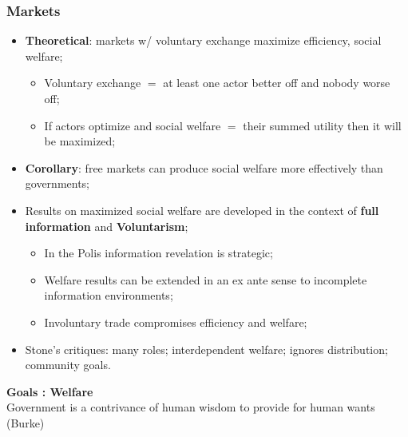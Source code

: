 \documentclass[aspectratio=169]{beamer}
\theoremstyle{principle}
\begin{document}
\begin{frame}
\frametitle{Markets}
\begin{itemize}
\item \textbf{Theoretical}: markets w/ voluntary exchange maximize efficiency, social welfare;
\begin{itemize}
\item Voluntary exchange $=$ at least one actor better off and nobody worse off;
\item If actors optimize and social welfare $=$ their summed utility then it will be maximized;
\end{itemize}
\bigskip
\bigskip
\item \textbf{Corollary}: free markets can produce social welfare more effectively than governments;
\bigskip
\bigskip
\item Results on maximized social welfare are developed in the context of \textbf{full information} and \textbf{Voluntarism};
\begin{itemize}
\item In the Polis information revelation is strategic;
\item Welfare results can be extended in an ex ante sense to incomplete information environments;
\item Involuntary trade compromises efficiency and welfare; %
\end{itemize}
\bigskip
\bigskip
\item Stone's critiques: many roles; interdependent welfare; ignores distribution; community goals.
\end{itemize}

\end{frame}

\begin{frame}

\begin{center}
\Huge\textbf{Goals : Welfare}\\
\bigskip
\bigskip
\large Government is a contrivance of human wisdom to provide for human wants (Burke)
\end{center}

\end{frame}
\end{document}

